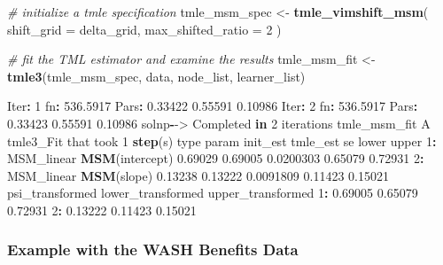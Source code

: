 \documentclass[12pt, krantz2,]{krantz}
\newenvironment{Shaded}{\begin{snugshade}}{\end{snugshade}}
\newcommand{\CommentTok}[1]{\textcolor[rgb]{0.37,0.37,0.37}{\textit{#1}}}
\newcommand{\ControlFlowTok}[1]{\textcolor[rgb]{0.27,0.27,0.27}{\textbf{#1}}}
\newcommand{\DataTypeTok}[1]{\textcolor[rgb]{0.27,0.27,0.27}{#1}}
\newcommand{\DecValTok}[1]{\textcolor[rgb]{0.06,0.06,0.06}{#1}}
\newcommand{\FloatTok}[1]{\textcolor[rgb]{0.06,0.06,0.06}{#1}}
\newcommand{\KeywordTok}[1]{\textcolor[rgb]{0.27,0.27,0.27}{\textbf{#1}}}
\newcommand{\NormalTok}[1]{#1}
\newcommand{\OperatorTok}[1]{\textcolor[rgb]{0.43,0.43,0.43}{\textbf{#1}}}
\newcommand{\StringTok}[1]{\textcolor[rgb]{0.5,0.5,0.5}{#1}}
\theoremstyle{definition}
\theoremstyle{definition}
\theoremstyle{definition}
\newcommand{\1}{\mathbbm{1}}
\begin{document}
\begin{Shaded}
\begin{Highlighting}[]
\CommentTok{# initialize a tmle specification}
\NormalTok{tmle_msm_spec <-}\StringTok{ }\KeywordTok{tmle_vimshift_msm}\NormalTok{(}
  \DataTypeTok{shift_grid =}\NormalTok{ delta_grid,}
  \DataTypeTok{max_shifted_ratio =} \DecValTok{2}
\NormalTok{)}

\CommentTok{# fit the TML estimator and examine the results}
\NormalTok{tmle_msm_fit <-}\StringTok{ }\KeywordTok{tmle3}\NormalTok{(tmle_msm_spec, data, node_list, learner_list)}

\NormalTok{Iter}\OperatorTok{:}\StringTok{ }\DecValTok{1}\NormalTok{ fn}\OperatorTok{:}\StringTok{ }\FloatTok{536.5917}\NormalTok{     Pars}\OperatorTok{:}\StringTok{  }\FloatTok{0.33422} \FloatTok{0.55591} \FloatTok{0.10986}
\NormalTok{Iter}\OperatorTok{:}\StringTok{ }\DecValTok{2}\NormalTok{ fn}\OperatorTok{:}\StringTok{ }\FloatTok{536.5917}\NormalTok{     Pars}\OperatorTok{:}\StringTok{  }\FloatTok{0.33423} \FloatTok{0.55591} \FloatTok{0.10986}
\NormalTok{solnp}\OperatorTok{-}\NormalTok{->}\StringTok{ }\NormalTok{Completed }\ControlFlowTok{in} \DecValTok{2}\NormalTok{ iterations}
\NormalTok{tmle_msm_fit}
\NormalTok{A tmle3_Fit that took }\DecValTok{1} \KeywordTok{step}\NormalTok{(s)}
\NormalTok{         type          param init_est tmle_est        se   lower   upper}
\DecValTok{1}\OperatorTok{:}\StringTok{ }\NormalTok{MSM_linear }\KeywordTok{MSM}\NormalTok{(intercept)  }\FloatTok{0.69029}  \FloatTok{0.69005} \FloatTok{0.0200303} \FloatTok{0.65079} \FloatTok{0.72931}
\DecValTok{2}\OperatorTok{:}\StringTok{ }\NormalTok{MSM_linear     }\KeywordTok{MSM}\NormalTok{(slope)  }\FloatTok{0.13238}  \FloatTok{0.13222} \FloatTok{0.0091809} \FloatTok{0.11423} \FloatTok{0.15021}
\NormalTok{   psi_transformed lower_transformed upper_transformed}
\DecValTok{1}\OperatorTok{:}\StringTok{         }\FloatTok{0.69005}           \FloatTok{0.65079}           \FloatTok{0.72931}
\DecValTok{2}\OperatorTok{:}\StringTok{         }\FloatTok{0.13222}           \FloatTok{0.11423}           \FloatTok{0.15021}
\end{Highlighting}
\end{Shaded}

\hypertarget{example-with-the-wash-benefits-data}{%
\subsubsection{Example with the WASH Benefits Data}\label{example-with-the-wash-benefits-data}}
\end{document}
